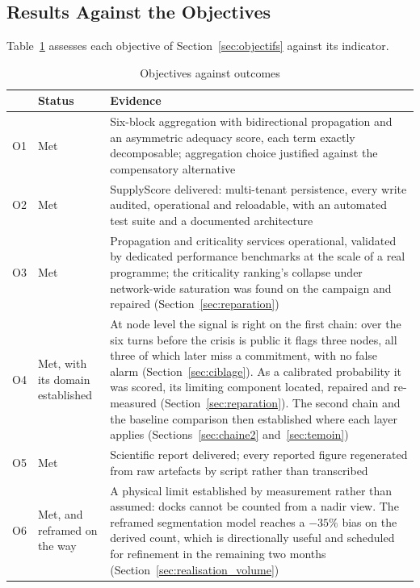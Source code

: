 \subsection{Results Against the Objectives}
\label{sec:conclusion_objectifs}

Table~\ref{tab:bilan} assesses each objective of Section~\ref{sec:objectifs} against its
indicator.

\begin{table}[htbp]
\centering
\caption{Objectives against outcomes}
\label{tab:bilan}
\small
\begin{tabularx}{\linewidth}{>{\raggedright\arraybackslash}p{0.7cm} >{\raggedright\arraybackslash}p{2.4cm} X}
\toprule
& \textbf{Status} & \textbf{Evidence} \\
\midrule
O1 & Met & Six-block aggregation with bidirectional propagation and an asymmetric adequacy
score, each term exactly decomposable; aggregation choice justified against the compensatory
alternative \\
O2 & Met & SupplyScore delivered: multi-tenant persistence, every write audited,
operational and reloadable, with an automated test suite and a documented
architecture \\
O3 & Met & Propagation and criticality services operational, validated by dedicated
performance benchmarks at the scale of a real programme; the criticality ranking's collapse
under network-wide saturation was found on the campaign and repaired
(Section~\ref{sec:reparation}) \\
O4 & Met, with its domain established & At node level the signal is right on the first chain:
over the six turns before the crisis is public it flags three nodes, all three of which later
miss a commitment, with no false alarm (Section~\ref{sec:ciblage}). As a calibrated
probability it was scored, its limiting component located, repaired and re-measured
(Section~\ref{sec:reparation}). The second chain and the baseline comparison then established
where each layer applies (Sections~\ref{sec:chaine2} and~\ref{sec:temoin}) \\
O5 & Met & Scientific report delivered; every reported figure regenerated from raw artefacts
by script rather than transcribed \\
O6 & Met, and reframed on the way & A physical limit established by measurement rather than
assumed: docks cannot be counted from a nadir view. The reframed segmentation model reaches a
$-35\%$ bias on the derived count, which is directionally useful and scheduled for refinement
in the remaining two months (Section~\ref{sec:realisation_volume}) \\
\bottomrule
\end{tabularx}
\end{table}

